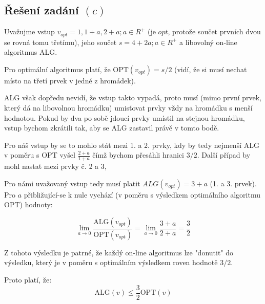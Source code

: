 \documentclass[a4paper, 12pt]{article}
\begin{document}
  \iffalse
  Pojďme si uvedený algoritmus rozebrat pro vstupy $v$ o různých délkách vstupu $n$.

  \subsubsection{Řešení pro $n \le 2$}
  Pokud platí, že $n \le 2$, tak se pro posloupnost $v=p_1,...,p_n$ algoritmus ALG$(v)$ chová stejně jako optimální algoritmus OPT$(v)$:
  \newpage
  \begin{equation*}
      \text{OPT}(v)=\text{ALG}(v)= \begin{cases}
        0 & n=0
        \\
        p_1 & n=1
        \\
        \text{MAX\footnotemark}(p_1, p_2) & n=2
      \end{cases}
  \end{equation*}
  \footnotetext{Funkce MAX$(a, b)$ vrací větší ze dvou vstupních čísel.}

  ALG první dva prvky umístí na dvě rozdílné hromádky. OPT se vždy chová stejně nebo lépe než ALG, takže mu v tomto případě nezbývá nic jiného, než dělat to samé.
  \fi

  \subsection{Řešení zadání $(c)$}
  Uvažujme vstup $v_{opt}=1,1+a,2+a; a \in R^+$ (je $opt$, protože součet prvních dvou se rovná tomu třetímu), jeho součet $s=4+2a; a \in R^+$ a libovolný on-line algoritmus ALG.

  Pro optimální algoritmus platí, že OPT$(v_{opt})=s/2$ (vidí, že si musí nechat místo na třetí prvek v jedné z hromádek).

  ALG však dopředu nevidí, že vstup takto vypadá, proto musí (mimo první prvek, který dá na libovolnou hromádku) umisťovat prvky vždy na hromádku s menší hodnotou. Pokud by dva po sobě jdoucí prvky umístil na stejnou hromádku, vstup bychom zkrátili tak, aby se ALG zastavil právě v tomto bodě.

  Pro náš vstup by se to mohlo stát mezi 1. a 2. prvky, kdy by tedy nejmenší ALG v poměru s OPT vyšel $\frac{2+a}{1+a}$ čímž bychom přesáhli hranici $3/2$. Další případ by mohl nastat mezi prvky č. 2 a 3,

  Pro námi uvažovaný vstup tedy musí platit $ALG(v_{opt})=3+a$ (1. a 3. prvek). Pro $a$ přibližující-se k nule vychází (v poměru s výsledkem optimálního algoritmu OPT) hodnoty:

  $$\lim_{a\to0} \frac{\text{ALG}(v_{opt})}{\text{OPT}(v_{opt})}
  =\lim_{a\to0} \frac{3+a}{2+a}
  =\frac{3}{2}$$

  Z tohoto výsledku je patrné, že každý on-line algoritmus lze "donutit" do výsledku, který je v poměru s optimálním výsledkem roven hodnotě $3/2$.

  Proto platí, že: $$\text{ALG}(v) \le \frac{3}{2}\text{OPT}(v)$$
\end{document}
